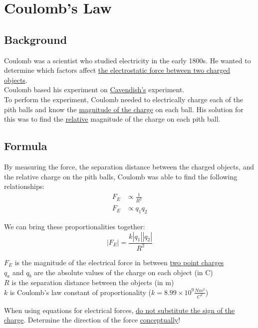 \section{Coulomb's Law}
\subsection{Background}
Coulomb was a scientist who studied electricity in the early 1800s. He wanted to determine which factors affect 
\underline{the electrostatic force between two charged objects}. \\

Coulomb based his experiment on \underline{Cavendish's} experiment.\\

To perform the experiment, Coulomb needed to electrically charge each of the pith balls and 
know the \underline{magnitude of the charge} on each ball. His solution for this was to find the 
\underline{relative} magnitude of the charge on each pith ball. 

\subsection{Formula}
By measuring the force, the separation distance between the charged objects, and the relative 
charge on the pith balls, Coulomb was able to find the following relationships:
\begin{align}
    F_{E} &\propto \tfrac{1}{R^2} \nonumber \\
    F_{E} &\propto q_{1}q_{2} \nonumber
\end{align}

We can bring these proportionalities together:
\begin{equation*}
    \left| F_E \right| = \frac{k \left |q_1 \right |  \left |q_2 \right |}{R^2}
\end{equation*}
\begin{center}
    $F_E$ is the magnitude of the electrical force in between \underline{two point charges}\\
    $q_a$ and $q_b$ are the absolute values of the charge on each object (in C)\\
    $R$ is the separation distance between the objects (in m)\\
    $k$ is Coulomb's law constant of proportionality ($k = 8.99 \times 10^9 \tfrac{Nm^2}{C^2}$)
\end{center}

\begin{remark}
    When using equations for electrical forces, \underline{do not substitute the sign of the charge}. Determine the direction of the force \underline{conceptually}!
\end{remark}

